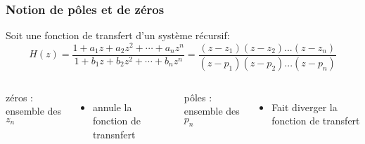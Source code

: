 \documentclass{beamer}
\begin{document}
\begin{frame}
\frametitle{Notion de pôles et de zéros}
Soit une fonction de transfert d'un système récursif: \\
\vspace{0.2cm}
\[ H(z) = \frac{1+ a_1 z + a_2 z^2 + \cdots + a_n z^n }{1+ b_1 z + b_2 z^2 + \cdots + b_n z^n} = \frac{(z-z_1)(z-z_2)...(z-z_n)}{(z-p_1)(z-p_2)...(z-p_n)} \] 

\vspace{0.3cm}

\begin{columns}
\column{60mm}
zéros : ensemble des $z_n$ \\
\begin{itemize}
\item<3-> annule la fonction de transnfert 
\end{itemize}
\column{60mm}
pôles : ensemble des $p_n$ \\
\begin{itemize}
\item<3-> Fait diverger la fonction de transfert
\end{itemize}

\end{columns} 



\end{frame}
\end{document}
